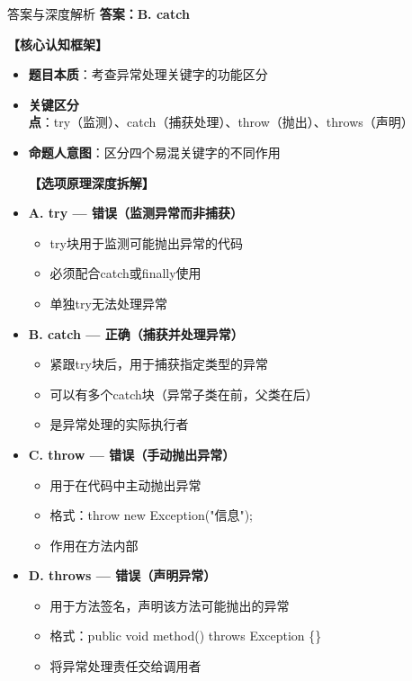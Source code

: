 \documentclass[12pt, a4paper]{ctexart}
\begin{document}
\begin{enumerate}[label=\textbf{\arabic*.}]
	      \begin{bluebox}{答案与深度解析}
		      \textbf{答案：B. catch}

		      \textbf{【核心认知框架】}
		      \begin{itemize}[label={}, leftmargin=*, nosep]
			      \item \textbf{题目本质}：考查异常处理关键字的功能区分
			      \item \textbf{关键区分点}：try（监测）、catch（捕获处理）、throw（抛出）、throws（声明）
			      \item \textbf{命题人意图}：区分四个易混关键字的不同作用

		      \textbf{【选项原理深度拆解】}

		      \item \textbf{A. try — 错误（监测异常而非捕获）}
		      \begin{itemize}[label={}, leftmargin=*, nosep]
			      \item try块用于监测可能抛出异常的代码
			      \item 必须配合catch或finally使用
			      \item 单独try无法处理异常
		      \end{itemize}

		      \item \textbf{B. catch — 正确（捕获并处理异常）}
		      \begin{itemize}[label={}, leftmargin=*, nosep]
			      \item 紧跟try块后，用于捕获指定类型的异常
			      \item 可以有多个catch块（异常子类在前，父类在后）
			      \item 是异常处理的实际执行者
		      \end{itemize}

		      \item \textbf{C. throw — 错误（手动抛出异常）}
		      \begin{itemize}[label={}, leftmargin=*, nosep]
			      \item 用于在代码中主动抛出异常
			      \item 格式：throw new Exception("信息");
			      \item 作用在方法内部
		      \end{itemize}

		      \item \textbf{D. throws — 错误（声明异常）}
		      \begin{itemize}[label={}, leftmargin=*, nosep]
			      \item 用于方法签名，声明该方法可能抛出的异常
			      \item 格式：public void method() throws Exception \{\}
			      \item 将异常处理责任交给调用者
		      \end{itemize}


\end{itemize}
\end{bluebox}
\end{enumerate}
\end{document}
